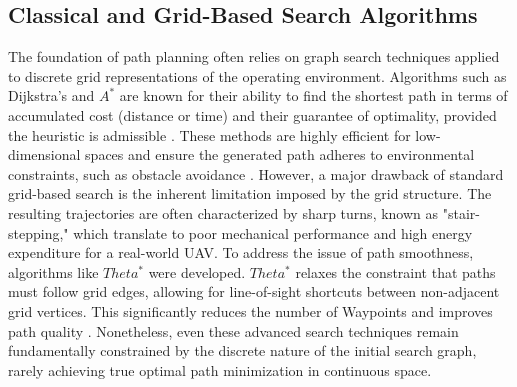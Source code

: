 \subsection{Classical and Grid-Based Search Algorithms}
The foundation of path planning often relies on graph search techniques applied to discrete grid representations of the operating environment. Algorithms such as Dijkstra's and $A^{*}$ are known for their ability to find the shortest path in terms of accumulated cost (distance or time) and their guarantee of optimality, provided the heuristic is admissible \cite{ref5}. These methods are highly efficient for low-dimensional spaces and ensure the generated path adheres to environmental constraints, such as obstacle avoidance \cite{ref11}. However, a major drawback of standard grid-based search is the inherent limitation imposed by the grid structure. The resulting trajectories are often characterized by sharp turns, known as "stair-stepping," which translate to poor mechanical performance and high energy expenditure for a real-world UAV. To address the issue of path smoothness, algorithms like $Theta^{*}$ were developed. $Theta^{*}$ relaxes the constraint that paths must follow grid edges, allowing for line-of-sight shortcuts between non-adjacent grid vertices. This significantly reduces the number of Waypoints and improves path quality \cite{ref7}. Nonetheless, even these advanced search techniques remain fundamentally constrained by the discrete nature of the initial search graph, rarely achieving true optimal path minimization in continuous space.

